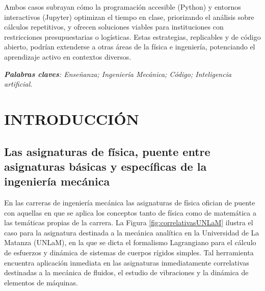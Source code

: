 \documentclass[a4paper]{fodami}        %
\begin{document}
Ambos casos subrayan cómo la programación accesible (Python) y entornos interactivos (Jupyter) optimizan el tiempo en clase, priorizando el análisis sobre cálculos repetitivos, y ofrecen soluciones viables para instituciones con restricciones presupuestarias o logísticas. Estas estrategias, replicables y de código abierto, podrían extenderse a otras áreas de la física e ingeniería, potenciando el aprendizaje activo en contextos diversos.


\textit{\textbf{Palabras claves}: Enseñanza; Ingeniería Mecánica; Código; Inteligencia artificial.}



\newpage
\onehalfspacing
\setlength{\parskip}{0pt}

\section{INTRODUCCIÓN}

\subsection{Las asignaturas de física, puente entre asignaturas básicas y específicas de la ingeniería mecánica}
En las carreras de ingeniería mecánica las asignaturas de física ofician de puente con aquellas en que se aplica los conceptos tanto de física como de matemática a las temáticas propias de la carrera. 
La Figura \ref{fig:correlativasUNLaM} ilustra el caso para la asignatura destinada a la mecánica analítica en la Universidad de La Matanza (UNLaM), en la que se dicta el formalismo Lagrangiano para el cálculo de esfuerzos y dinámica de sistemas de cuerpos rígidos simples.
Tal herramienta encuentra aplicación inmediata en las asignaturas inmediatamente correlativas destinadas a la mecánica de fluidos, el estudio de vibraciones y la dinámica de elementos de máquinas. 
\end{document}
